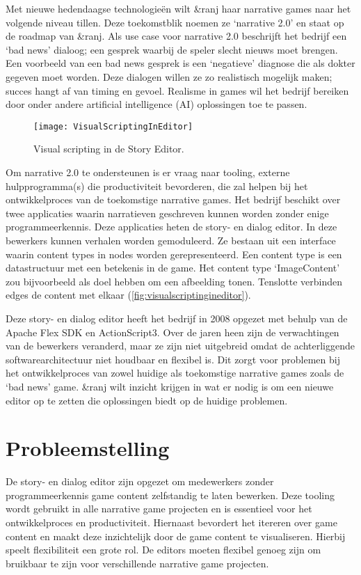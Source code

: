 Met nieuwe hedendaagse technologieën wilt \&ranj haar narrative games naar het volgende niveau tillen. Deze toekomstblik noemen ze ‘narrative 2.0’ en staat op de roadmap van \&ranj. Als use case voor narrative 2.0 beschrijft het bedrijf een ‘bad news’ dialoog; een gesprek waarbij de speler slecht nieuws moet brengen. Een voorbeeld van een bad news gesprek is een ‘negatieve’ diagnose die als dokter gegeven moet worden. Deze dialogen willen ze zo realistisch mogelijk maken; succes hangt af van timing en gevoel. Realisme in games wil het bedrijf bereiken door onder andere artificial intelligence (AI) oplossingen toe te passen.

\begin{figure}[htb]
    \centering
    \texttt{[image: VisualScriptingInEditor]}
    \caption{Visual scripting in de Story Editor.}
    \label{fig:visualscriptingineditor}
\end{figure}

Om narrative 2.0 te ondersteunen is er vraag naar tooling, externe hulpprogramma(s) die productiviteit bevorderen\cite{Pizzi}, die zal helpen bij het ontwikkelproces van de toekomstige narrative games. Het bedrijf beschikt over twee applicaties waarin narratieven geschreven kunnen worden zonder enige programmeerkennis. Deze applicaties heten de story- en dialog editor. In deze bewerkers kunnen verhalen worden gemoduleerd. Ze bestaan uit een interface waarin content types in nodes worden gerepresenteerd. Een content type is een datastructuur met een betekenis in de game. Het content type ‘ImageContent’ zou bijvoorbeeld als doel hebben om een afbeelding tonen. Tenslotte verbinden edges de content met elkaar (\autoref{fig:visualscriptingineditor}).

Deze story- en dialog editor heeft het bedrijf in 2008 opgezet met behulp van de Apache Flex SDK en ActionScript3. Over de jaren heen zijn de verwachtingen van de bewerkers veranderd, maar ze zijn niet uitgebreid omdat de achterliggende softwarearchitectuur niet houdbaar en flexibel is. Dit zorgt voor problemen bij het ontwikkelproces van zowel huidige als toekomstige narrative games zoals de ‘bad news’ game. \&ranj wilt inzicht krijgen in wat er nodig is om een nieuwe editor op te zetten die oplossingen biedt op de huidige problemen.

\pagebreak
\section{Probleemstelling}
De story- en dialog editor zijn opgezet om medewerkers zonder programmeerkennis game content zelfstandig te laten bewerken. Deze tooling wordt gebruikt in alle narrative game projecten en is essentieel voor het ontwikkelproces en productiviteit. Hiernaast bevordert het itereren over game content en maakt deze inzichtelijk door de game content te visualiseren. Hierbij speelt flexibiliteit een grote rol. De editors moeten flexibel genoeg zijn om bruikbaar te zijn voor verschillende narrative game projecten.

